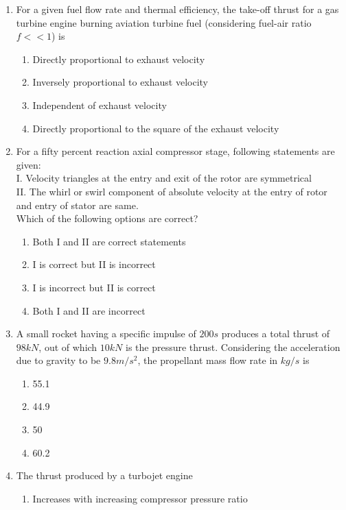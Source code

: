 \documentclass[journal]{IEEEtran}
\begin{document}
\begin{enumerate}
\item For a given fuel flow rate and thermal efficiency, the take-off thrust for a gas turbine engine burning aviation turbine fuel (considering fuel-air ratio $f<<1$) is
    \begin{enumerate}
      \item Directly proportional to exhaust velocity 
      \item Inversely proportional to exhaust velocity
      \item Independent of exhaust velocity
      \item Directly proportional to the square of the exhaust velocity \\
    \end{enumerate}
\item For a fifty percent reaction axial compressor stage, following  statements are given: \\
I. Velocity triangles at the entry and exit of the rotor are symmetrical \\
II. The whirl or swirl component of absolute velocity at the entry of rotor and entry of stator are same. \\
Which of the following options are correct?
\begin{enumerate}
    \item Both I and II are correct statements 
    \item I is correct but II is incorrect
    \item I is incorrect but II is correct
    \item Both I and II are incorrect \\
\end{enumerate}
\item A small rocket having a specific impulse of $200s$ produces a total thrust of $98kN$, out of which $10kN$ is the pressure thrust. Considering the acceleration due to gravity to be $9.8m/s^2$, the propellant mass flow rate in $kg/s$ is
\begin{enumerate}
    \item 55.1 
    \item 44.9
    \item 50
    \item 60.2 \\
\end{enumerate}
\item The thrust produced by a turbojet engine
 \begin{enumerate}
     \item Increases with increasing compressor pressure ratio

\end{enumerate}
\end{enumerate}
\end{document}
